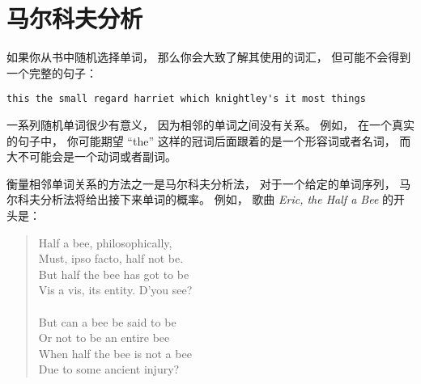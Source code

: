 \section{马尔科夫分析}
\label{markov}


如果你从书中随机选择单词， 那么你会大致了解其使用的词汇， 但可能不会得到一个完整的句子：

\begin{lstlisting}
this the small regard harriet which knightley's it most things
\end{lstlisting}


一系列随机单词很少有意义， 因为相邻的单词之间没有关系。  
例如， 在一个真实的句子中， 你可能期望 ``the'' 这样的冠词后面跟着的是一个形容词或者名词， 
而大不可能会是一个动词或者副词。  


衡量相邻单词关系的方法之一是马尔科夫分析法， 对于一个给定的单词序列， 
马尔科夫分析法将给出接下来单词的概率。   例如， 歌曲 {\em Eric, the Half a
Bee} 的开头是：

\begin{quote}
Half a bee, philosophically, \\
Must, ipso facto, half not be. \\
But half the bee has got to be \\
Vis a vis, its entity. D'you see? \\
\\
But can a bee be said to be \\
Or not to be an entire bee \\
When half the bee is not a bee \\
Due to some ancient injury? \\
\end{quote}

